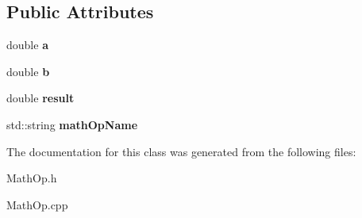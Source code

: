 \subsection*{Public Attributes}
\begin{DoxyCompactItemize}
\item 
\hypertarget{class_math_op_afa40241343dc3c5d550e13c45ec3a958}{}double {\bfseries a}\label{class_math_op_afa40241343dc3c5d550e13c45ec3a958}

\item 
\hypertarget{class_math_op_afff7e10b49bb685057eea3b6cd1cdd90}{}double {\bfseries b}\label{class_math_op_afff7e10b49bb685057eea3b6cd1cdd90}

\item 
\hypertarget{class_math_op_a156f7ed952cbc7b0efe5a53cb3706d88}{}double {\bfseries result}\label{class_math_op_a156f7ed952cbc7b0efe5a53cb3706d88}

\item 
\hypertarget{class_math_op_ae747c21140de4a79fada80575519ca22}{}std\+::string {\bfseries math\+Op\+Name}\label{class_math_op_ae747c21140de4a79fada80575519ca22}

\end{DoxyCompactItemize}


The documentation for this class was generated from the following files\+:\begin{DoxyCompactItemize}
\item 
Math\+Op.\+h\item 
Math\+Op.\+cpp\end{DoxyCompactItemize}
